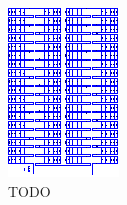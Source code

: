 \begin{figure}[h!tb]
    \centering
    \includegraphics[width=\textwidth]{images/ltspice/generic-iv-curves/module.eps}
    \caption{%
        TODO
    }
    \label{fig:ltspice:iv:generic:module}
\end{figure}

